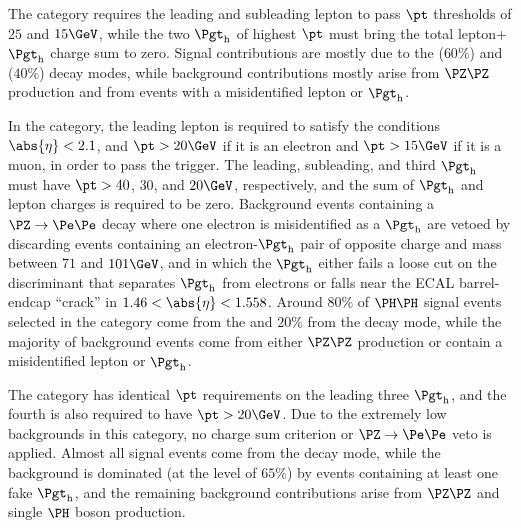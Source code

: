 The \lltt category requires
the leading and subleading lepton to pass $\pt$ thresholds of $25$ and $15\GeV$, 
while the two $\tauh$ of highest $\pt$ must bring the total lepton+$\tauh$ charge sum to zero.
Signal contributions are mostly due to the \WWtt ($60\%$) and \tttt ($40\%$) decay modes, 
while background contributions mostly arise from $\PZ\PZ$ production and from events with a misidentified lepton or $\tauh$.

In the \lttt category,
the leading lepton is required to satisfy the conditions 
$\abs{\eta} < 2.1$, and $\pt > 20\GeV$ if it is an electron and $\pt > 15\GeV$ if it is a muon,
in order to pass the trigger.
The leading, subleading, and third
$\tauh$ must have $\pt > 40$, $30$, and $20\GeV$, respectively, and the sum of $\tauh$ and lepton charges is required to be zero.
Background events containing a $\Zee$ decay where one electron is misidentified
as a $\tauh$ are vetoed by discarding events containing an electron-$\tauh$ pair of opposite charge
and mass between $71$ and $101\GeV$, and in which the $\tauh$ either fails a loose cut on the discriminant that separates $\tauh$ from electrons
or falls near the ECAL barrel-endcap ``crack'' in $1.46 < \abs{\eta} < 1.558$.  Around $80\%$ of $\HH$ signal events selected in the \lttt category
come from the \tttt and $20\%$ from the \WWtt decay mode, while the majority of
background events come from either $\PZ\PZ$ production or contain a misidentified lepton or $\tauh$.

The \noltttt category has identical $\pt$ requirements on the leading three $\tauh$,
and the fourth \tauh is also required to have $\pt > 20\GeV$.  Due to the extremely
low backgrounds in this category, no charge sum criterion or $\Zee$ veto is applied.  Almost
all signal events come from the \tttt decay mode, while the background is dominated (at the level of $65\%$) by events 
containing at least one fake $\tauh$, and the remaining background contributions arise from $\PZ\PZ$ and single
$\PHiggs$ boson production.

